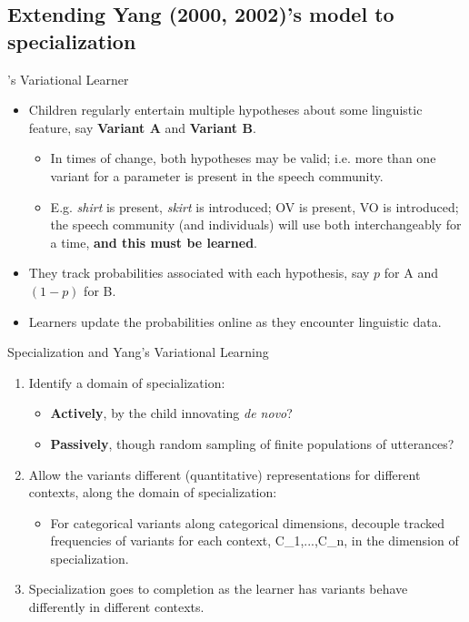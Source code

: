 \documentclass[hyperref={pdfpagelabels=false}]{beamer}
\begin{document}
\subsection{Extending Yang (2000, 2002)'s model to specialization}


\begin{frame}{\citet{yang2000,yang2002}'s Variational Learner}
\begin{itemize}
	\item Children regularly entertain multiple hypotheses about some linguistic feature, say \textbf{Variant A} and \textbf{Variant B}.
	\begin{itemize}
		\item In times of change, both hypotheses may be valid; i.e. more than one variant for a parameter is present in the speech community.
		\item E.g. \textsl{shirt} is present, \textsl{skirt} is introduced; OV is present, VO is introduced; the speech community (and individuals) will use both interchangeably for a time, \textbf{and this must be learned}.
	\end{itemize}
	\item They track probabilities associated with each hypothesis, say $p$ for A and $(1-p)$ for B.
	\item Learners update the probabilities online as they encounter linguistic data.
\end{itemize}
\end{frame}


\begin{frame}{Specialization and Yang's Variational Learning}
		\begin{enumerate}
			\item Identify a domain of specialization:
				\begin{itemize}
					\item \textbf{Actively}, by the child innovating \textsl{de novo}?
					\item \textbf{Passively}, though random sampling of finite populations of utterances?
				\end{itemize}
			\item Allow the variants different (quantitative) representations for different contexts, along the domain of specialization:
			\begin{itemize}
				\item For categorical variants along categorical dimensions, decouple tracked frequencies of variants for each context, C_1,...,C_n, in the dimension of specialization.
			\end{itemize}
			\item Specialization goes to completion as the learner has variants behave differently in different contexts.		\end{enumerate}
\end{frame}
\end{document}
